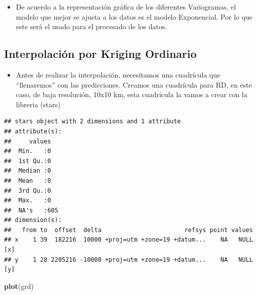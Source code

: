 \documentclass[11pt,]{article}
\newenvironment{Shaded}{\begin{snugshade}}{\end{snugshade}}
\newcommand{\KeywordTok}[1]{\textcolor[rgb]{0.13,0.29,0.53}{\textbf{#1}}}
\newcommand{\DataTypeTok}[1]{\textcolor[rgb]{0.13,0.29,0.53}{#1}}
\newcommand{\DecValTok}[1]{\textcolor[rgb]{0.00,0.00,0.81}{#1}}
\newcommand{\StringTok}[1]{\textcolor[rgb]{0.31,0.60,0.02}{#1}}
\newcommand{\CommentTok}[1]{\textcolor[rgb]{0.56,0.35,0.01}{\textit{#1}}}
\newcommand{\OperatorTok}[1]{\textcolor[rgb]{0.81,0.36,0.00}{\textbf{#1}}}
\newcommand{\NormalTok}[1]{#1}
\providecommand{\tightlist}{%
\setlength{\itemsep}{0pt}\setlength{\parskip}{0pt}}
\begin{document}
\begin{itemize}
\tightlist
\item
  De acuerdo a la representación gráfica de los diferentes Variogramas,
  el modelo que mejor se ajusta a los datos es el modelo Exponencial.
  Por lo que este será el usado para el procesado de los datos.
\end{itemize}

\subsection{Interpolación por Kriging
Ordinario}\label{interpolaciuxf3n-por-kriging-ordinario-1}

\begin{itemize}
\tightlist
\item
  Antes de realizar la interpolación, necesitamos una cuadrícula que
  ``llenaremos'' con las predicciones. Creamos una cuadrícula para RD,
  en este caso, de baja resolución, 10x10 km, esta cuadricula la vamos a
  crear con la libreria (stars)
\end{itemize}

\begin{Shaded}
\end{Shaded}

\begin{verbatim}
## stars object with 2 dimensions and 1 attribute
## attribute(s):
##     values    
##  Min.   :0    
##  1st Qu.:0    
##  Median :0    
##  Mean   :0    
##  3rd Qu.:0    
##  Max.   :0    
##  NA's   :605  
## dimension(s):
##   from to  offset  delta                       refsys point values    
## x    1 39  182216  10000 +proj=utm +zone=19 +datum...    NA   NULL [x]
## y    1 28 2205216 -10000 +proj=utm +zone=19 +datum...    NA   NULL [y]
\end{verbatim}

\begin{Shaded}
\begin{Highlighting}[]
\KeywordTok{plot}\NormalTok{(grd)}
\end{Highlighting}
\end{Shaded}
\end{document}
